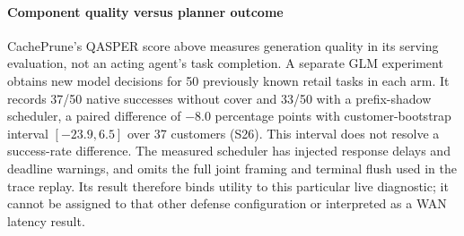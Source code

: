 \paragraph{Component quality versus planner outcome}
CachePrune's QASPER score above measures generation quality in its serving evaluation, not an acting agent's task completion. A separate GLM experiment obtains new model decisions for 50 previously known retail tasks in each arm. It records 37/50 native successes without cover and 33/50 with a prefix-shadow scheduler, a paired difference of $-8.0$ percentage points with customer-bootstrap interval $[-23.9,6.5]$ over 37 customers (S26). This interval does not resolve a success-rate difference. The measured scheduler has injected response delays and deadline warnings, and omits the full joint framing and terminal flush used in the trace replay. Its result therefore binds utility to this particular live diagnostic; it cannot be assigned to that other defense configuration or interpreted as a WAN latency result.

